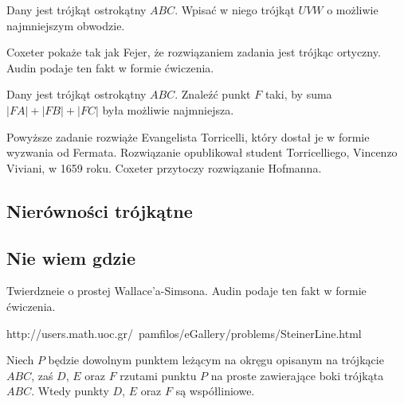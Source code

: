 \begin{problem}
	Dany jest trójkąt ostrokątny $ABC$.
	Wpisać w niego trójkąt $UVW$ o możliwie najmniejszym obwodzie.
%
\end{problem}

Coxeter \cite[s. 36, 37]{coxeter_1967} pokaże tak jak Fejer, że rozwiązaniem zadania jest trójkąc ortyczny.
Audin \cite[s. 101]{audin_2003} podaje ten fakt w formie ćwiczenia. %

\begin{problem}
	\label{punkt_fermata}
	Dany jest trójkąt ostrokątny $ABC$.
	Znaleźć punkt $F$ taki, by suma $|FA| + |FB| + |FC|$ była możliwie najmniejsza.
%
\end{problem}


Powyższe zadanie rozwiąże Evangelista Torricelli, który dostał je w formie wyzwania od Fermata.
%
Rozwiązanie opublikował student Torricelliego, Vincenzo Viviani, w 1659 roku.
Coxeter \cite[s. 37]{coxeter_1967} przytoczy rozwiązanie Hofmanna. %

\subsection{Nierówności trójkątne}


\subsection{Nie wiem gdzie}


Twierdzneie o prostej Wallace'a-Simsona. %
Audin \cite[s. 104]{audin_2003} podaje ten fakt w formie ćwiczenia.

http://users.math.uoc.gr/~pamfilos/eGallery/problems/SteinerLine.html

\begin{proposition}
	Niech $P$ będzie dowolnym punktem leżącym na okręgu opisanym na trójkącie $ABC$, zaś $D$, $E$ oraz $F$ rzutami punktu $P$ na proste zawierające boki trójkąta $ABC$.
	Wtedy punkty $D$, $E$ oraz $F$ są współliniowe.
\end{proposition}

